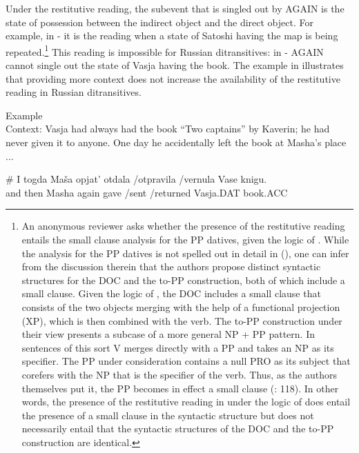 \documentclass[output=paper,modfonts,nonflat,
 hidelinks
]{langsci/langscibook}
\begin{document}
{Under the restitutive reading, the subevent that is singled out by} {AGAIN}{ is the state of possession between the indirect object and the direct object. For example, in - it is the reading when a state of Satoshi having the map is being repeated.}\footnote{An anonymous reviewer asks whether the presence of the restitutive reading entails the small clause analysis for the PP datives, given the logic of \citet{BeckJohnson2004}. While the analysis for the PP datives is not spelled out in detail in (\citealt{BeckJohnson2004}), one can infer from the discussion therein that the authors propose distinct syntactic structures for the DOC and the to-PP construction, both of which include a small clause. Given the logic of \citet{BeckJohnson2004}, the DOC includes a small clause that consists of the two objects merging with the help of a functional projection (XP), which is then combined with the verb. The to-PP construction under their view presents a subcase of a more general NP + PP pattern. In sentences of this sort V merges directly with a PP and takes an NP as its specifier. The PP under consideration contains a null PRO as its subject that corefers with the NP that is the specifier of the verb. Thus, as the authors themselves put it, the PP becomes in effect a small clause (\citealt{BeckJohnson2004}: 118). In other words, the presence of the restitutive reading in  under the logic of \citet{BeckJohnson2004} does entail the presence of a small clause in the syntactic structure but does not necessarily entail that the syntactic structures of the DOC and the to-PP construction are identical.}{ This reading is impossible for Russian ditransitives: in -} {AGAIN}{ cannot single out the state of Vasja having the book. The example in  illustrates that providing more context does not increase the availability of the restitutive reading in Russian ditransitives.}


 \ea\label{ex:bondarenko:}
{{Example}}\\

Context: Vasja had always had the book “Two captains” by Kaverin; he had never given it to anyone. One day he accidentally left the book at Masha’s place ...

\ea
\gll         \# I togda Maša opjat’ otdala /otpravila /vernula Vase knigu.\\
 and then Masha again gave /sent /returned Vasja.DAT book.ACC\\
\end{document}
